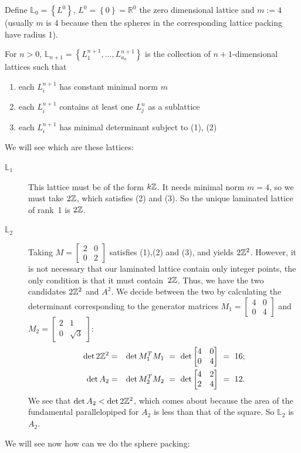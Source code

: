Define $\mathbb{L}_0=\left\{L^{0}\right\}$, $L^{0}=\left\{0\right\}=\mathbb{R}^{0}$ the
zero dimensional lattice and $m:=4$ (usually $m$ is 4 because then the spheres in the
corresponding lattice packing have radius 1).

For $n>0$, $\mathbb{L}_{n+1}=\left\{L_1^{n+1},\ldots,L_{a_n}^{n+1}\right\}$ is the collection of $n+1$-dimensional lattices such that
\begin{enumerate}
\item each $L_i^{n+1}$ has constant minimal norm $m$
\item each $L_i^{n+1}$ contains at least one $L_j^n$ as a sublattice
\item each $L_i^{n+1}$ has minimal determinant subject to (1), (2)
\end{enumerate}


We will see which are these lattices:

\begin{description}
\item[$\mathbb{L}_1$] This lattice must be of the form  $k\mathbb{Z}$.
It needs minimal norm $m=4$, so we must take $2\mathbb{Z}$, which satisfies (2) and (3).
So the unique laminated lattice of rank~1 is $2\mathbb{Z}$.


\item[$\mathbb{L}_2$] Taking $M=\left[\begin{smallmatrix}
      2 & 0 \\
      0 & 2\end{smallmatrix}\right]$ satisfies (1),(2) and (3), and yields
  $2\mathbb{Z}^{2}$. However, it is not necessary that our laminated lattice contain only integer
  points, the only condition is that it must contain~$2\mathbb{Z}$. Thus, we have the two
  candidates $2\mathbb{Z}^{2}$ and $A^{2}$. We decide between the two by
  calculating the determinant corresponding to the generator matrices $M_1=
  \left[\begin{smallmatrix}
    4 & 0\\
    0 & 4
  \end{smallmatrix}\right]$ and $M_2 = \left[\begin{smallmatrix}
        2 & 1 \\
        0 & \sqrt{3} \end{smallmatrix}\right]$:
  \begin{eqnarray*}
    \det 2\mathbb{Z}^{2} 
    & = & 
    \det M_1^{T}M_1 \ = \ \det\begin{bmatrix}
        4 & 0 \\
        0 & 4 \end{bmatrix} \ = \ 16;
      \\
    \det A_2
    &=& 
    \det M_2^{T}M_2 \ = \ \det\begin{bmatrix}
        4 & 2 \\
        2 & 4 \end{bmatrix} \ = \ 12.
\end{eqnarray*}
We see that $\det A_2 < \det 2\mathbb{Z}^{2}$, which comes about because the area of the
fundamental parallelopiped for $A_2$ is less than that of the square. So $\mathbb{L}_2$
is~$A_2$.
\end{description}
We will see now how can we do the sphere packing:


